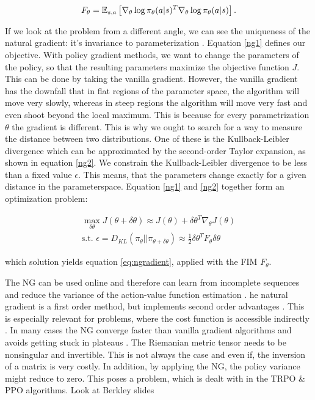 \begin{equation}
	F_\theta=\operatorname{\mathbb{E}}_{s,a}\left[\nabla_{\theta}\log\pi_{\theta}(a|s)^{T}\nabla_{\theta}\log\pi_{\theta}(a|s)\right].
\end{equation}

If we look at the problem from a different angle, we can see the uniqueness of the natural gradient: it's invariance to parameterization \cite{pascanu2013revisiting, peters2008natural}. Equation \ref{ng1} defines our objective. With policy gradient methods, we want to change the parameters of the policy, so that the resulting parameters maximize the objective function $J$. This can be done by taking the vanilla gradient. However, the vanilla gradient has the downfall that in flat regions of the parameter space, the algorithm will move very slowly, whereas in steep regions the algorithm will move very fast and even shoot beyond the local maximum. This is because for every parametrization $\theta$ the gradient is different. This is why we ought to search for a way to measure the distance between two distributions. One of these is the Kullback-Leibler divergence which can be approximated by the second-order Taylor expansion, as shown in equation \ref{ng2}. We constrain the Kullback-Leibler divergence to be less than a fixed value $\epsilon$. This means, that the parameters change exactly for a given distance in the parameterspace. Equation \ref{ng1} and \ref{ng2} together form an optimization problem:

\begin{align}
	\max_{\delta\theta} J(\theta + \delta\theta) \approx J(\theta) + \delta\theta^T\nabla_\theta J(\theta)\label{ng1}\\
	\text{s.t. } \epsilon = D_{KL}(\pi_{\theta} || \pi_{\theta + \delta\theta}) \approx \tfrac{1}{2} \delta\theta^T F_\theta \delta\theta\label{ng2}
\end{align}

which solution yields equation \ref{eq:ngradient}, applied with the FIM $F_\theta$.

\begin{itemize}
	\x {} The NG can be used online and therefore can learn from incomplete sequences and reduce the variance of the action-value function estimation \cite{pascanu2013revisiting, peters2008natural}.
	\x {} he natural gradient is a first order method, but implements second order advantages \cite{pascanu2013revisiting}. This is especially relevant for problems, where the cost function is accessible indirectly \cite{desjardins2013metric}.
	\x {} In many cases the NG converge faster than vanilla gradient algorithms \cite{sohl2012natural, amari1998natural} and avoids getting stuck in plateaus \cite{amari1998efficiently, amari1998natural}.
	\x {} The Riemanian metric tensor needs to be nonsingular and invertible. This is not always the case and even if, the inversion of a matrix is very costly. In addition, by applying the NG, the policy variance might reduce to zero. This poses a problem, which is dealt with in the TRPO \& PPO algorithms.
	\x 	Look at Berkley slides
\end{itemize}

